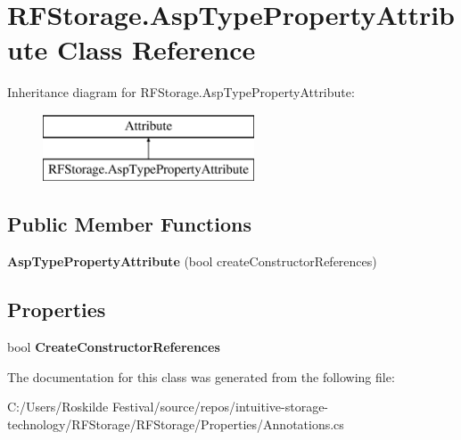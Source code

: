 \section{R\+F\+Storage.\+Asp\+Type\+Property\+Attribute Class Reference}
\label{class_r_f_storage_1_1_asp_type_property_attribute}
Inheritance diagram for R\+F\+Storage.\+Asp\+Type\+Property\+Attribute\+:\begin{figure}[H]
\begin{center}
\leavevmode
\includegraphics[height=2.000000cm]{class_r_f_storage_1_1_asp_type_property_attribute}
\end{center}
\end{figure}
\subsection*{Public Member Functions}
\begin{DoxyCompactItemize}
\item 
\mbox{\label{class_r_f_storage_1_1_asp_type_property_attribute_a4af39daccd9d1c440738f26371751326}} 
{\bfseries Asp\+Type\+Property\+Attribute} (bool create\+Constructor\+References)
\end{DoxyCompactItemize}
\subsection*{Properties}
\begin{DoxyCompactItemize}
\item 
\mbox{\label{class_r_f_storage_1_1_asp_type_property_attribute_a11524c19cfb1861dee33c39b6fa82dac}} 
bool {\bfseries Create\+Constructor\+References}\hspace{0.3cm}{\ttfamily  [get]}
\end{DoxyCompactItemize}


The documentation for this class was generated from the following file\+:\begin{DoxyCompactItemize}
\item 
C\+:/\+Users/\+Roskilde Festival/source/repos/intuitive-\/storage-\/technology/\+R\+F\+Storage/\+R\+F\+Storage/\+Properties/Annotations.\+cs\end{DoxyCompactItemize}
